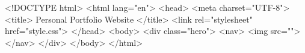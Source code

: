 <!DOCTYPE html>
<html lang="en">
<head>
    <meta charset="UTF-8">
    <title> Personal Portfolio Website </title>
    <link rel="stylesheet" href="style.css">
</head>
<body>
    <div class="hero">
        <nav>
            <img src="">
            </nav>
        </div>
</body>
</html>